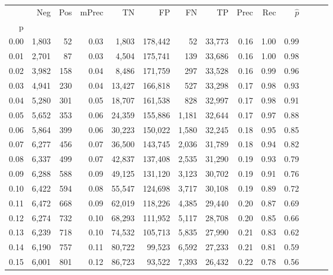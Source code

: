 \begin{tabular}{rrrrrrrrrrrrrr}
\toprule
{} &    Neg &  Pos & mPrec &       TN &       FP &      FN &      TP &  Prec &   Rec & $\hat{p}$ \\
p    &        &      &       &          &          &         &         &       &       &           \\
\midrule
0.00 &  1,803 &   52 &  0.03 &    1,803 &  178,442 &      52 &  33,773 &  0.16 &  1.00 &      0.99 \\
0.01 &  2,701 &   87 &  0.03 &    4,504 &  175,741 &     139 &  33,686 &  0.16 &  1.00 &      0.98 \\
0.02 &  3,982 &  158 &  0.04 &    8,486 &  171,759 &     297 &  33,528 &  0.16 &  0.99 &      0.96 \\
0.03 &  4,941 &  230 &  0.04 &   13,427 &  166,818 &     527 &  33,298 &  0.17 &  0.98 &      0.93 \\
0.04 &  5,280 &  301 &  0.05 &   18,707 &  161,538 &     828 &  32,997 &  0.17 &  0.98 &      0.91 \\
0.05 &  5,652 &  353 &  0.06 &   24,359 &  155,886 &   1,181 &  32,644 &  0.17 &  0.97 &      0.88 \\
0.06 &  5,864 &  399 &  0.06 &   30,223 &  150,022 &   1,580 &  32,245 &  0.18 &  0.95 &      0.85 \\
0.07 &  6,277 &  456 &  0.07 &   36,500 &  143,745 &   2,036 &  31,789 &  0.18 &  0.94 &      0.82 \\
0.08 &  6,337 &  499 &  0.07 &   42,837 &  137,408 &   2,535 &  31,290 &  0.19 &  0.93 &      0.79 \\
0.09 &  6,288 &  588 &  0.09 &   49,125 &  131,120 &   3,123 &  30,702 &  0.19 &  0.91 &      0.76 \\
0.10 &  6,422 &  594 &  0.08 &   55,547 &  124,698 &   3,717 &  30,108 &  0.19 &  0.89 &      0.72 \\
0.11 &  6,472 &  668 &  0.09 &   62,019 &  118,226 &   4,385 &  29,440 &  0.20 &  0.87 &      0.69 \\
0.12 &  6,274 &  732 &  0.10 &   68,293 &  111,952 &   5,117 &  28,708 &  0.20 &  0.85 &      0.66 \\
0.13 &  6,239 &  718 &  0.10 &   74,532 &  105,713 &   5,835 &  27,990 &  0.21 &  0.83 &      0.62 \\
0.14 &  6,190 &  757 &  0.11 &   80,722 &   99,523 &   6,592 &  27,233 &  0.21 &  0.81 &      0.59 \\
0.15 &  6,001 &  801 &  0.12 &   86,723 &   93,522 &   7,393 &  26,432 &  0.22 &  0.78 &      0.56 \\

\end{tabular}
